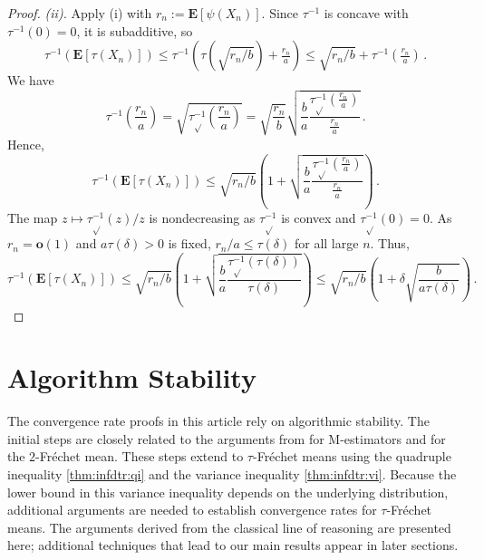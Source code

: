 \documentclass{article}
\newcommand*{\mo}[1]{\mathbf{#1}}
\newcommand{\lab}{\left[} %
\newcommand{\rab}{\right]} %
\newcommand{\ab}[1]{\lab #1 \rab} %
\newcommand{\abOf}[1]{\!\ab{#1}} %
\newcommand{\lb}{\left(} %
\newcommand{\rb}{\right)} %
\newcommand{\br}[1]{\lb #1 \rb} %
\newcommand{\brOf}[1]{\!\br{#1}} %
\newcommand{\E}{\mathbf{E}} %
\newcommand{\Eof}[1]{\E[#1]}
\newcommand{\EOf}[1]{\E\abOf{#1}}
\newcommand{\eqfs}{\,.}
\newcommand{\tran}{\tau}
\newcommand{\trans}{\tau_{\sqrt{}}}
\begin{document}
\begin{proof}
    \emph{(ii).}
    Apply (i) with $r_n:=\Eof{\psi(X_n)}$. Since $\tran^{-1}$ is concave with
    $\tran^{-1}(0)=0$, it is subadditive, so
    \begin{equation}
        \tran^{-1}\brOf{\EOf{\tran(X_n)}}
        \leq \tran^{-1}\brOf{\tran\brOf{\sqrt{r_n/b}}+\tfrac{r_n}{a}}
        \leq \sqrt{r_n/b}+\tran^{-1}\brOf{\tfrac{r_n}{a}}
        \eqfs
    \end{equation}
    We have
    \begin{equation}
        \tran^{-1}\brOf{\frac{r_n}{a}}
        =\sqrt{\trans^{-1}\brOf{\frac{r_n}{a}}}
        =
        \sqrt{\frac{r_n}{b}} \sqrt{\frac{b}{a} \frac{\trans^{-1}\brOf{\frac{r_n}{a}} }{\frac{r_n}{a}}}
        \eqfs
    \end{equation}
    Hence,
    \begin{equation}
        \tran^{-1}\brOf{\EOf{\tran(X_n)}}
        \leq
        \sqrt{r_n/b} \br{1 + \sqrt{\frac{b}{a} \frac{\trans^{-1}\brOf{\frac{r_n}{a}} }{\frac{r_n}{a}}}}
        \eqfs
    \end{equation}    
    The map $z\mapsto \trans^{-1}(z)/z$ is nondecreasing as $\trans^{-1}$ is convex and $\trans^{-1}(0)=0$.
    As $r_n=\mo o(1)$ and $a \tran(\delta)>0$ is fixed, $r_n/a\leq\tran(\delta)$ for all large $n$. 
    Thus,
    \begin{equation}
        \tran^{-1}\brOf{\EOf{\tran(X_n)}}
        \leq
        \sqrt{r_n/b} \br{1 + \sqrt{\frac{b}{a} \frac{\trans^{-1}\brOf{\tran(\delta)} }{\tran(\delta)}}}
        \leq
        \sqrt{r_n/b} \br{1 + \delta \sqrt{\frac{b}{a\tran(\delta)}}}
        \eqfs
    \end{equation}    
\end{proof}

\section{Algorithm Stability}\label{sec:algostabi}
%
The convergence rate proofs in this article rely on algorithmic stability. The initial steps are closely related to the arguments from \cite{Escande2024} for M-estimators and \cite{brunel2025} for the $2$-Fr\'echet mean. These steps extend to $\tran$-Fr\'echet means using the quadruple inequality \cref{thm:infdtr:qi} and the variance inequality \cref{thm:infdtr:vi}. Because the lower bound in this variance inequality depends on the underlying distribution, additional arguments are needed to establish convergence rates for $\tran$-Fr\'echet means. The arguments derived from the classical line of reasoning are presented here; additional techniques that lead to our main results appear in later sections.
\end{document}
